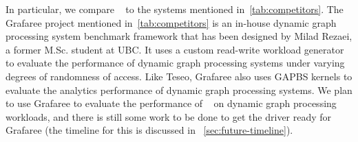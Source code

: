 In particular, we compare ~\project{} to the systems mentioned in~\autoref{tab:competitors}.
The Grafaree project mentioned in~\autoref{tab:competitors} is an in-house dynamic graph processing system benchmark framework that has been designed by Milad Rezaei, a former M.Sc. student at UBC.
It uses a custom read-write workload generator to evaluate the performance of dynamic graph processing systems under varying degrees of randomness of access.
Like Teseo, Grafaree also uses \ac{GAPBS} kernels to evaluate the analytics performance of dynamic graph processing systems.
We plan to use Grafaree to evaluate the performance of ~\project{} on dynamic graph processing workloads, and there is still some work to be done to get the \project{} driver ready for Grafaree (the timeline for this is discussed in ~\autoref{sec:future-timeline}).

